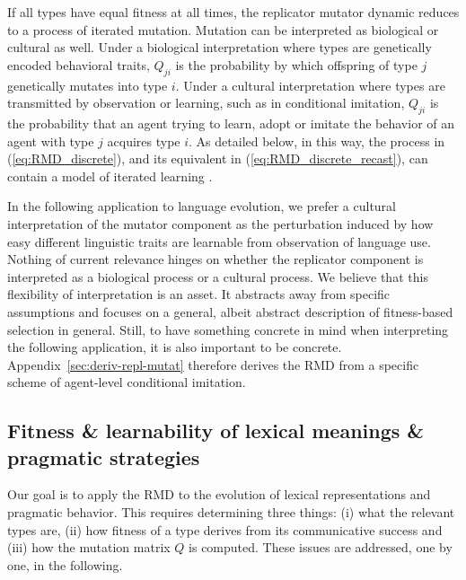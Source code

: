 \documentclass[a4paper, 11pt]{article}
\theoremstyle{Satz}
\begin{document}
If all types have equal fitness at all times, the replicator mutator dynamic reduces to a
process of iterated mutation. Mutation can be interpreted as biological or cultural as
well. Under a biological interpretation where types are genetically encoded behavioral traits,
$Q_{ji}$ is the probability by which offspring of type $j$ genetically mutates into type
$i$. Under a cultural interpretation where types are transmitted by observation or learning,
such as in conditional imitation, $Q_{ji}$ is the probability that an agent trying to learn,
adopt or imitate the behavior of an agent with type $j$ acquires type $i$. As detailed below,
in this way, the process in (\ref{eq:RMD_discrete}), and its equivalent in
(\ref{eq:RMD_discrete_recast}), can contain a model of iterated learning
\citep{griffiths+kalish:2005,griffiths+kalish:2007}.

In the following application to language evolution, we prefer a cultural interpretation of the
mutator component as the perturbation induced by how easy different linguistic traits are
learnable from observation of language use. Nothing of current relevance hinges on whether the
replicator component is interpreted as a biological process or a cultural process. We believe
that this flexibility of interpretation is an asset. It abstracts away from specific
assumptions and focuses on a general, albeit abstract description of fitness-based selection in
general. Still, to have something concrete in mind when interpreting the following application,
it is also important to be concrete. Appendix~\ref{sec:deriv-repl-mutat} therefore derives the
RMD from a specific scheme of agent-level conditional imitation.


\subsection{Fitness \& learnability of lexical meanings \& pragmatic strategies}
\label{sec:fitn--learn}


Our goal is to apply the RMD to the evolution of lexical representations and pragmatic
behavior. This requires determining three things: (i) what the relevant types are, (ii) how
fitness of a type derives from its communicative success and (iii) how the mutation matrix $Q$
is computed. These issues are addressed, one by one, in the following.
\end{document}
